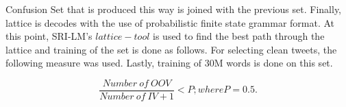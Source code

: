 Confusion Set that is produced this way is joined with the previous set. Finally, lattice is decodes with the use of probabilistic finite state grammar format. At this point, SRI-LM's $lattice-tool$ is used to find the best path through the lattice and training of the set is done as follows. For selecting clean tweets, the following measure was used. Lastly, training of 30M words is done on this set.

\begin{equation}
\label{eq:pr}
\frac{\mathit{Number\ of\ OOV}}{\mathit{Number\ of\ IV+1}} < P ; where P=0.5.
\end{equation}


\begin{table}[t]
\centering

\aftertabspace
\end{table}
  










  
